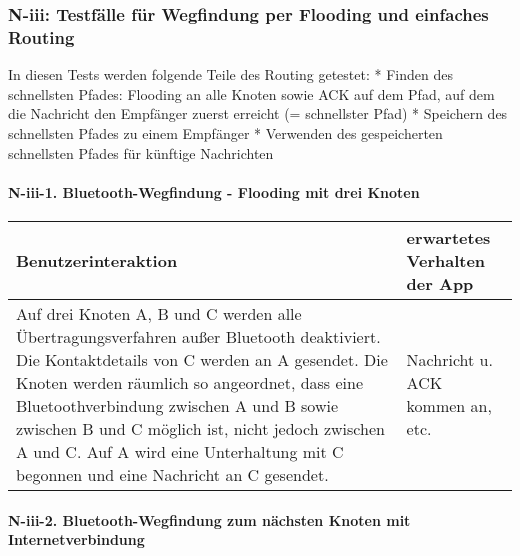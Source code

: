 
\clearpage
\subsubsection{N-iii: Testfälle für Wegfindung per Flooding und einfaches
Routing}\label{iii-testfuxe4lle-fuxfcr-wegfindung-per-flooding-und-einfaches-routing}

In diesen Tests werden folgende Teile des Routing getestet: * Finden des
schnellsten Pfades: Flooding an alle Knoten sowie ACK auf dem Pfad, auf
dem die Nachricht den Empfänger zuerst erreicht (= schnellster Pfad) *
Speichern des schnellsten Pfades zu einem Empfänger * Verwenden des
gespeicherten schnellsten Pfades für künftige Nachrichten

\paragraph{N-iii-1. Bluetooth-Wegfindung - Flooding mit drei
Knoten}\label{bluetooth-wegfindung---flooding-mit-drei-knoten}

\begin{longtable}{p{8cm}p{8.5cm}}
\toprule
Benutzerinteraktion & erwartetes Verhalten der App\tabularnewline
\midrule
\endhead
Auf drei Knoten A, B und C werden alle Übertragungsverfahren außer
Bluetooth deaktiviert. Die Kontaktdetails von C werden an A gesendet.
Die Knoten werden räumlich so angeordnet, dass eine Bluetoothverbindung
zwischen A und B sowie zwischen B und C möglich ist, nicht jedoch
zwischen A und C. Auf A wird eine Unterhaltung mit C begonnen und eine
Nachricht an C gesendet. & Nachricht u. ACK kommen an,
etc.\tabularnewline
\bottomrule
\end{longtable}

\paragraph{N-iii-2. Bluetooth-Wegfindung zum nächsten Knoten mit
Internetverbindung}\label{bluetooth-wegfindung-zum-nuxe4chsten-knoten-mit-internetverbindung}


